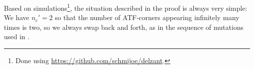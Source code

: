 \documentclass[12pt,a4paper,abstract=true,draft]{scrartcl}
\begin{document}
\begin{remark}
    Based on simulations\footnote{Done using \url{https://github.com/schmijoe/delzant}.}, the situation described in the proof is always very simple: 
    We have $n_c'=2$ so that the number of ATF-corners appearing infinitely many times is two, so we always swap back and forth, as in the sequence of mutations used in \cite{EvaUrz21}.
\end{remark}


\printbibliography
\end{document}
